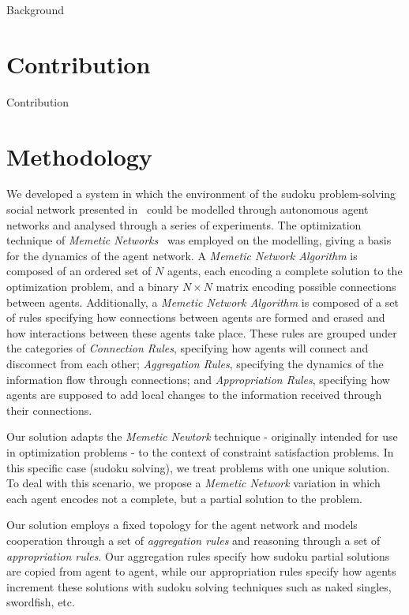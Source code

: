 \documentclass{article}
\begin{document}
Background

\section{Contribution}

Contribution

\section{Methodology}

We developed a system in which the environment of the sudoku problem-solving social network presented in~\cite{farenzena:collabem} could be modelled through autonomous agent networks and analysed through a series of experiments. The optimization technique of {\em Memetic Networks}~\cite{lamb:memenet} was employed on the modelling, giving a basis for the dynamics of the agent network. A {\em Memetic Network Algorithm} is composed of an ordered set of $N$ agents, each encoding a complete solution to the optimization problem, and a binary $N \times N$ matrix encoding possible connections between agents. Additionally, a {\em Memetic Network Algorithm} is composed of a set of rules specifying how connections between agents are formed and erased and how interactions between these agents take place. These rules are grouped under the categories of {\em Connection Rules}, specifying how agents will connect and disconnect from each other; {\em Aggregation Rules}, specifying the dynamics of the information flow through connections; and {\em Appropriation Rules}, specifying how agents are supposed to add local changes to the information received through their connections.

Our solution adapts the {\em Memetic Newtork} technique - originally intended for use in optimization problems - to the context of constraint satisfaction problems. In this specific case (sudoku solving), we treat problems with one unique solution. To deal with this scenario, we propose a {\em Memetic Network} variation in which each agent encodes not a complete, but a partial solution to the problem.

Our solution employs a fixed topology for the agent network and models cooperation through a set of {\em aggregation rules} and reasoning through a set of {\em appropriation rules}. Our aggregation rules specify how sudoku partial solutions are copied from agent to agent, while our appropriation rules specify how agents increment these solutions with sudoku solving techniques such as naked singles, swordfish, etc.
\end{document}
